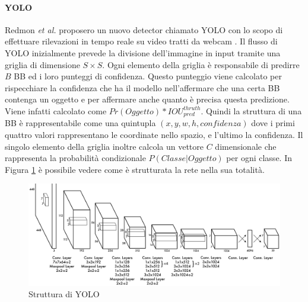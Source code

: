 \paragraph{YOLO}
Redmon \textit{et al.} proposero un nuovo detector chiamato \ac{YOLO} con lo scopo di effettuare rilevazioni in tempo reale su video tratti da webcam \cite{redmon2016you}. 
Il flusso di \ac{YOLO} inizialmente prevede la divisione dell'immagine in input tramite una griglia di dimensione $S \times S$. 
Ogni elemento della griglia è responsabile di predirre $B$ \ac{BB} ed i loro punteggi di confidenza. Questo punteggio viene calcolato per rispecchiare la confidenza che ha il modello nell'affermare che una certa \ac{BB} contenga un oggetto e per affermare anche quanto è precisa questa predizione. Viene infatti calcolato come $Pr(Oggetto) * IOU^{thruth}_{pred}$.
Quindi la struttura di una \ac{BB} è rappresentabile come una quintupla $(x, y, w, h, confidenza)$ dove i primi quattro valori rappresentano le coordinate nello spazio, e l'ultimo la confidenza. 
Il singolo elemento della griglia inoltre calcola un vettore $C$ dimensionale che rappresenta la probabilità condizionale $P(Classe | Oggetto)$ per ogni classe. In Figura \ref{fig:yolo_structure} è possibile vedere come è strutturata la rete nella sua totalità. 
\begin{figure}[]
    \centering
    \includegraphics[width=\textwidth]{images/net_yolo.pdf}
    \caption{Struttura di \ac{YOLO} \cite{redmon2016you}}
    \label{fig:yolo_structure}
\end{figure}

